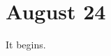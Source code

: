 \documentclass[../notes.tex]{subfiles}
\begin{document}
\section{August 24}

It begins.
\end{document}
